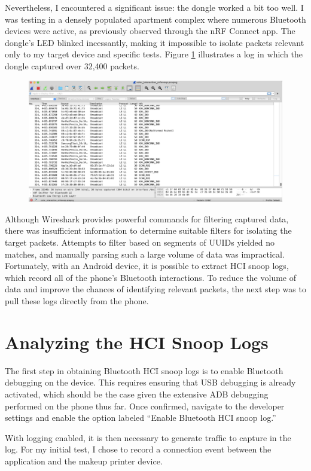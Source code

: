 Nevertheless, I encountered a significant issue: the dongle worked a bit too well. I was testing in a densely populated apartment complex where numerous Bluetooth devices were active, as previously observed through the nRF Connect app. The dongle’s LED blinked incessantly, making it impossible to isolate packets relevant only to my target device and specific tests. Figure \ref*{fig:wiresharkpacketsniffing} illustrates a log in which the dongle captured over 32,400 packets.

\begin{figure}
	\centering
	\includegraphics[width=0.7\linewidth]{wireshark_packet_sniffing}
	\caption{}
	\label{fig:wiresharkpacketsniffing}
\end{figure}

Although Wireshark provides powerful commands for filtering captured data, there was insufficient information to determine suitable filters for isolating the target packets. Attempts to filter based on segments of UUIDs yielded no matches, and manually parsing such a large volume of data was impractical. Fortunately, with an Android device, it is possible to extract HCI snoop logs, which record all of the phone’s Bluetooth interactions. To reduce the volume of data and improve the chances of identifying relevant packets, the next step was to pull these logs directly from the phone.

\section{Analyzing the HCI Snoop Logs}
The first step in obtaining Bluetooth HCI snoop logs is to enable Bluetooth debugging on the device. This requires ensuring that USB debugging is already activated, which should be the case given the extensive ADB debugging performed on the phone thus far. Once confirmed, navigate to the developer settings and enable the option labeled “Enable Bluetooth HCI snoop log.”

With logging enabled, it is then necessary to generate traffic to capture in the log. For my initial test, I chose to record a connection event between the application and the makeup printer device.

